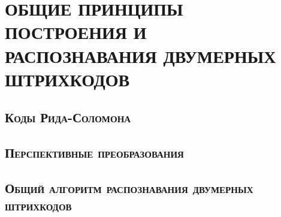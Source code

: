 \section{ОБЩИЕ ПРИНЦИПЫ ПОСТРОЕНИЯ И \\
РАСПОЗНАВАНИЯ ДВУМЕРНЫХ ШТРИХКОДОВ}

\subsection{\textsc{Коды Рида-Соломона}}
\label{sec:RSCode}

\subsection{\textsc{Перспективные преобразования}}

\subsection{\textsc{Общий алгоритм распознавания
двумерных штрихкодов}}